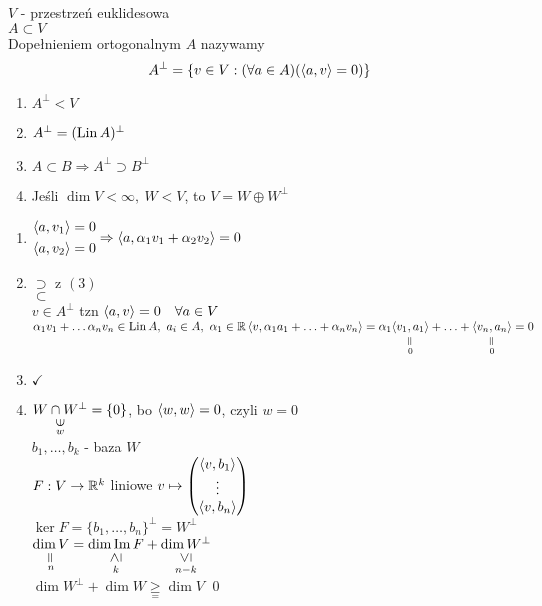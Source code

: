\begin{df} 
    $V$ - przestrzeń euklidesowa \\ 
    $A \subset V$ \\ 
    Dopełnieniem ortogonalnym $A$ nazywamy 
    \[ A^\bot = \{ v \in V: (\forall a \in A) (\left\langle a, v \right\rangle = 0)\}\]
\end{df} 
\begin{ft} \hfill 
    \begin{enumerate}[(1)] 
        \item $A^\bot < V$ 
        \item $A^\bot = (\operatorname{Lin} A)^\bot$
        \item $A \subset B \Rightarrow A^\bot \supset B^\bot$ 
        \item Jeśli $\dim V < \infty, \ W < V$, to $V = W \oplus W^\bot$
    \end{enumerate} 
\end{ft}
\begin{dd} \hfill 
    \begin{enumerate}[(1)] 
        \item $\begin{aligned} \left\langle a, v_1 \right\rangle = 0 \\ \left\langle a, v_2 \right\rangle = 0 \end{aligned}
            \Rightarrow \left\langle a, \alpha_1 v_1 + \alpha_2 v_2 \right\rangle = 0$
        \item $\supset$ z $(3)$ \\
              $\subset$ \\ 
              $ v \in A^\bot$ tzn $\left\langle a, v \right\rangle = 0 \quad \forall a \in V$ \\ 
              $\alpha_1 v_1 + \ldots \alpha_n v_n \in \Lin A,\ a_i \in A,\ \alpha_1 \in\RR
              \\ \scp v{\alpha_1 a_1 + \ldots + \alpha_n v_n} =
              \alpha_1 \underscript{\scp{v_1}{a_1}}{\verteq}{0} + \ldots +
              \underscript{\scp{v_n}{a_n}}{\verteq}{0} = 0$ 
        \item $\checkmark$
        \item $\underscript{W \cap W^\bot}{\vertni}{w} = \{0\}$, bo $\left\langle w, w \right\rangle = 0$, czyli 
            $w = 0$ \\ 
            $b_1,\ldots,b_k$ - baza $W$ \\ 
            $F: V \to \mathbb{R}^k$ liniowe $v \mapsto \begin{pmatrix} \left\langle v, b_1 \right\rangle \\ \vdots \\ 
            \left\langle v, b_n \right\rangle \end{pmatrix}$ \\ 
            $\ker F = \{b_1,\ldots,b_n\}^\bot = W^\bot$ \\ 
            $\underscript{\dim V}{\verteq}{n} = \underscript{\dim\operatorname{Im}F}
            {\vertge}{k} + \underscript{\dim W^\bot}{\vertle}{n-k}$ \\ 
            $\dim W^\bot + \dim W \underset{=}{\ge} \dim V$ \hfill \qed
    \end{enumerate} 
\end{dd} 
